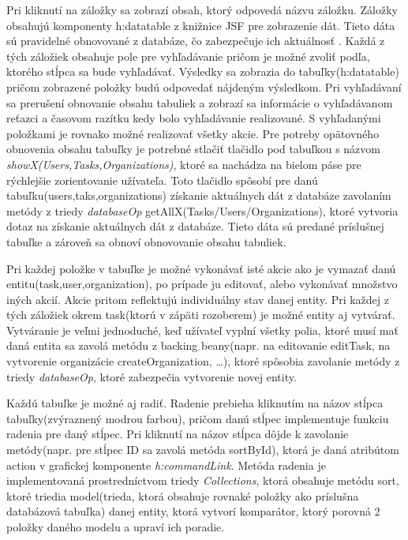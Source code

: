 Pri kliknutí na záložky sa zobrazí obsah, ktorý odpovedá názvu záložku. Záložky  obsahujú komponenty h:datatable z knižnice JSF pre zobrazenie dát. Tieto dáta sú pravidelné obnovované z databáze, čo zabezpečuje ich aktuálnosť . Každá z tých záložiek obsahuje pole pre vyhľadávanie pričom je možné zvoliť podľa, ktorého stĺpca sa bude vyhľadávať. Výsledky sa zobrazia do tabuľky(h:datatable) pričom zobrazené položky budú odpovedať nájdeným výsledkom. Pri vyhľadávaní sa prerušení obnovanie obsahu tabuliek a zobrazí sa informácie o vyhľadávanom reťazci a časovom razítku kedy bolo vyhľadávanie realizované. S vyhľadanými položkami je rovnako možné realizovať všetky akcie. Pre potreby opätovného obnovenia obsahu tabuľky je potrebné stlačiť tlačidlo pod tabuľkou s názvom \emph{showX(Users,Tasks,Organizations)}, ktoré sa nachádza na bielom páse pre rýchlejšie zorientovanie užívateľa. Toto tlačidlo spôsobí pre danú tabuľku(users,taks,organizations) získanie aktuálnych dát z databáze zavolaním metódy z triedy \emph{databaseOp} getAllX(Tasks/Users/Organizations), ktoré vytvoria dotaz na získanie aktuálnych dát z databáze. Tieto dáta sú predané príslušnej tabuľke a zároveň sa obnoví obnovovanie obsahu tabuliek.

 Pri každej položke v tabuľke je možné vykonávať isté akcie ako je vymazať danú entitu(task,user,organization), po prípade ju editovať, alebo vykonávať množstvo iných akcií. Akcie pritom reflektujú individuálny stav danej entity. Pri každej z tých záložiek okrem task(ktorú v zápäti rozoberem) je možné entity aj vytvárať. Vytváranie je veľmi jednoduché, keď užívateľ vyplní všetky polia, ktoré musí mať daná entita sa zavolá metódu z backing beany(napr. na editovanie editTask, na vytvorenie organizácie createOrganization, \ldots), ktoré spôsobia zavolanie metódy z triedy \emph{databaseOp}, ktoré zabezpečia vytvorenie novej entity. 

 Každú tabuľke je možné aj radiť. Radenie prebieha kliknutím na názov stĺpca tabuľky(zvýraznený modrou farbou), pričom danú stĺpec implementuje funkciu radenia pre daný stĺpec. Pri kliknutí na názov stĺpca dôjde k zavolanie metódy(napr. pre stĺpec ID sa zavolá metóda sortById), ktorá je daná atribútom action v grafickej komponente \emph{h:commandLink}. Metóda radenia je implementovaná prostredníctvom triedy \emph{Collections}, ktorá obsahuje metódu sort, ktoré triedia model(trieda, ktorá obsahuje rovnaké položky ako príslušna databázová tabuľka) danej entity, ktorá vytvorí komparátor, ktorý porovná 2 položky daného modelu a upraví ich poradie.


